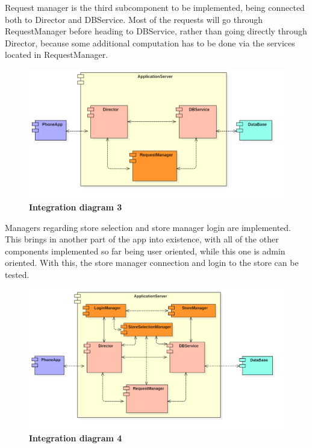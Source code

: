  

Request manager is the third subcomponent to be implemented, being connected both to Director and DBService. Most of the requests will go through RequestManager before heading to DBService, rather than going directly through Director, because some additional computation has to be done via the services located in RequestManager. 

 
\begin{figure}[!h]
\centering
\includegraphics[width=\textwidth]{Images/IntegrationDiagram3}
\caption{\label{fig:imp3}\textbf{Integration diagram 3}}
\end{figure}

 

Managers regarding store selection and store manager login are implemented. This brings in another part of the app into existence, with all of the other components implemented so far being user oriented, while this one is admin oriented. With this, the store manager connection and login to the store can be tested. 

 
\begin{figure}[!h]
\centering
\includegraphics[width=\textwidth]{Images/IntegrationDiagram4}
\caption{\label{fig:imp4}\textbf{Integration diagram 4}}
\end{figure}
 


